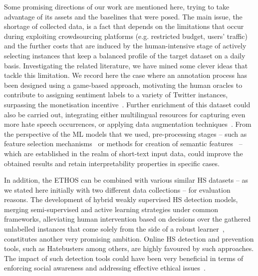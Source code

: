 \documentclass{article}
\begin{document}
Some promising directions of our work are mentioned here, trying to take advantage of its assets and the baselines that were posed. The main issue, the shortage of collected data, is a fact that depends on the limitations that occur during exploiting crowdsourcing platforms (e.g. restricted budget, users' traffic) and the further costs that are induced by the human-intensive stage of actively selecting instances that keep a balanced profile of the target dataset on a daily basis. Investigating the related literature, we have mined some clever ideas that tackle this limitation. We record here the case where an annotation process has been designed using a game-based approach, motivating the human oracles to contribute to assigning sentiment labels to a variety of Twitter instances, surpassing the monetisation incentive~\cite{DBLP:journals/puc/FuriniM18}. Further enrichment of this dataset could also be carried out, integrating either multilingual resources for capturing even more hate speech occurrences, or applying data augmentation techniques~\cite{DBLP:conf/sac/ShimLLV20}. From the perspective of the ML models that we used, pre-processing stages -- such as feature selection mechanisms~\cite{DBLP:journals/inffus/TommaselG18} or methods for creation of semantic features~\cite{DBLP:journals/csl/SkrljMKLP21} -- which are established in the realm of short-text input data, could improve the obtained results and retain interpretability properties in specific cases.

In addition, the ETHOS can be combined with various similar HS datasets -- as we stated here initially with two different data collections -- for evaluation reasons. The development of hybrid weakly supervised HS detection models, merging semi-supervised and active learning strategies under common frameworks, alleviating human intervention based on decisions over the gathered unlabelled instances that come solely from the side of a robust learner~\cite{DBLP:conf/iisa/KarlosKAFK19,DBLP:journals/mlc/YuFXQ19}, constitutes another very promising ambition. Online HS detection and prevention tools, such as Hatebusters among others, are highly favoured by such approaches. The impact of such detection tools could have been very beneficial in terms of enforcing social awareness and addressing effective ethical issues~\cite{DBLP:conf/sai/AlharthiR20,DBLP:conf/ijcai/DinakarPL15}.
\end{document}
